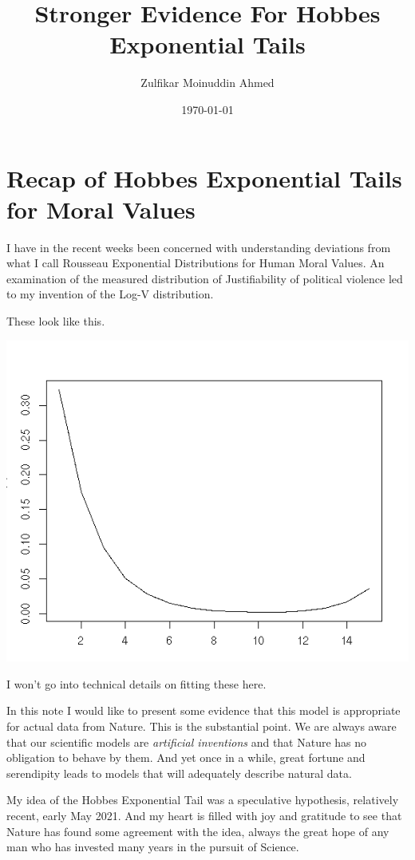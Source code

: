 \documentclass{amsart}
\title{Stronger Evidence For Hobbes Exponential Tails}
\author{Zulfikar Moinuddin Ahmed}
\date{\today}
\begin{document}
\maketitle

\section{Recap of Hobbes Exponential Tails for Moral Values}

I have in the recent weeks been concerned with understanding deviations from what I call Rousseau Exponential Distributions for Human Moral Values.  An examination of the measured distribution of Justifiability of political violence led to my invention of the Log-V distribution.

These look like this.

\includegraphics[scale=0.8]{synthterror.jpeg}

I won't go into technical details on fitting these here.

In this note I would like to present some evidence that this model is appropriate for actual data from Nature.  This is the substantial point.  We are always aware that our scientific models are {\em artificial inventions} and that Nature has no obligation to behave by them.  And yet once in a while, great fortune and serendipity leads to models that will adequately describe natural data.

My idea of the Hobbes Exponential Tail was a speculative hypothesis, relatively recent, early May 2021.  And my heart is filled with joy and gratitude to see that Nature has found some agreement with the idea, always the great hope of any man who has invested many years in the pursuit of Science.  
\end{document}
